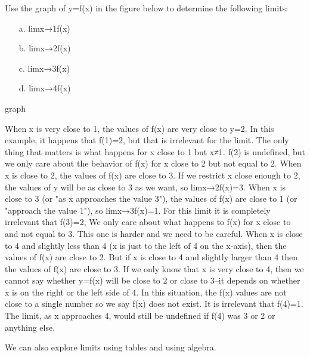 \begin{example}
Use the graph of y=f(x) in the figure below to determine the following limits:
\begin{itemize}
  \item[a.] limx→1f(x)
  \item[b.] limx→2f(x)
  \item[c.] limx→3f(x)
  \item[d.] limx→4f(x)
\end{itemize}
graph
\begin{solution} When x is very close to 1, the values of f(x) are very close to y=2. In this example, it happens that f(1)=2, but that is irrelevant for the limit. The only thing that matters is what happens for x close to 1 but x≠1.
f(2) is undefined, but we only care about the behavior of f(x) for x close to 2 but not equal to 2. When x is close to 2, the values of f(x) are close to 3. If we restrict x close enough to 2, the values of y will be as close to 3 as we want, so limx→2f(x)=3.
When x is close to 3 (or "as x approaches the value 3"), the values of f(x) are close to 1 (or "approach the value 1"), so limx→3f(x)=1. For this limit it is completely irrelevant that f(3)=2, We only care about what happens to f(x) for x close to and not equal to 3.
This one is harder and we need to be careful. When x is close to 4 and slightly less than 4 (x is just to the left of 4 on the x-axis), then the values of f(x) are close to 2. But if x is close to 4 and slightly larger than 4 then the values of f(x) are close to 3. If we only know that x is very close to 4, then we cannot say whether y=f(x) will be close to 2 or close to 3–it depends on whether x is on the right or the left side of 4. In this situation, the f(x) values are not close to a single number so we say f(x) does not exist. It is irrelevant that f(4)=1. The limit, as x approaches 4, would still be undefined if f(4) was 3 or 2 or anything else.
\end{solution}\end{example}
We can also explore limits using tables and using algebra.

